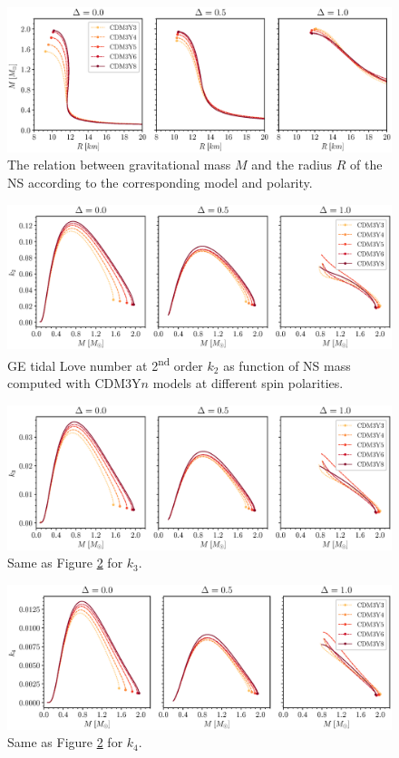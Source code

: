 \begin{figure}[ht!]
        \centering
        \includegraphics[width=\textwidth]{fig/MR.eps}
        \caption{The relation between gravitational mass $M$ and the radius $R$ of the \gls{NS} according to the corresponding model and polarity.}
        \label{fig:mr}
\end{figure} 
\begin{figure}[ht!]
        \centering
        \includegraphics[width=\textwidth]{fig/k2.eps}
        \caption{\gls{GE} tidal Love number at 2\textsuperscript{nd} order $k_2$ as function of \gls{NS} mass computed with CDM3Y$n$ models at different spin polarities.}
        \label{fig:k2}
\end{figure} 
\begin{figure}[ht!]
        \centering
        \includegraphics[width=\textwidth]{fig/k3.eps}
        \caption{Same as Figure \ref{fig:k2} for $k_3$.}
        \label{fig:k3}
\end{figure} 
\begin{figure}[ht!]
        \centering
        \includegraphics[width=\textwidth]{fig/k4.eps}
        \caption{Same as Figure \ref{fig:k2} for $k_4$.}
        \label{fig:k4}
\end{figure} 
